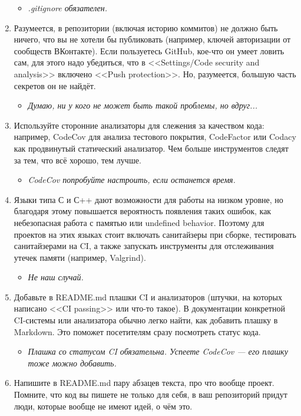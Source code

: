 \documentclass{../../text-style}
\begin{document}
\begin{enumerate}
    \begin{itemize}
        \item \emph{.gitignore обязателен.}
    \end{itemize}
    \item Разумеется, в репозитории (включая историю коммитов) не должно быть ничего, что вы не хотели бы публиковать (например, ключей авторизации от сообществ ВКонтакте). Если пользуетесь GitHub, кое-что он умеет ловить сам, для этого надо убедиться, что в <<Settings/Code security and analysis>> включено <<Push protection>>. Но, разумеется, большую часть секретов он не найдёт.
    \begin{itemize}
        \item \emph{Думаю, ни у кого не может быть такой проблемы, но вдруг...}
    \end{itemize}
    \item Используйте сторонние анализаторы для слежения за качеством кода: например, CodeCov для анализа тестового покрытия, CodeFactor или Codacy как продвинутый статический анализатор. Чем больше инструментов следят за тем, что всё хорошо, тем лучше.
    \begin{itemize}
        \item \emph{CodeCov попробуйте настроить, если останется время.}
    \end{itemize}
    \item Языки типа С и С++ дают возможности для работы на низком уровне, но благодаря этому повышается вероятность появления таких ошибок, как небезопасная работа с памятью или undefined behavior. Поэтому для проектов на этих языках стоит включать санитайзеры при сборке, тестировать санитайзерами на CI, а также запускать инструменты для отслеживания утечек памяти (например, Valgrind).
    \begin{itemize}
        \item \emph{Не наш случай.}
    \end{itemize}
    \item Добавьте в README.md плашки CI и анализаторов (штучки, на которых написано <<CI passing>> или что-то такое). В документации конкретной CI-системы или анализатора обычно легко найти, как добавить плашку в Markdown. Это поможет посетителям сразу посмотреть статус кода.
    \begin{itemize}
        \item \emph{Плашка со статусом CI обязательна. Успеете CodeCov --- его плашку тоже можно добавить.}
    \end{itemize}
    \item Напишите в README.md пару абзацев текста, про что вообще проект. Помните, что код вы пишете не только для себя, в ваш репозиторий придут люди, которые вообще не имеют идей, о чём это.

\end{enumerate}
\end{document}
